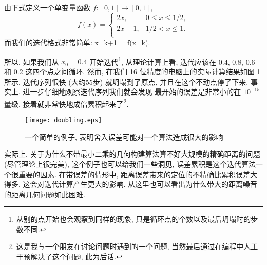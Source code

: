 \documentclass{CASthesis_zzk}
\begin{document}
由下式定义一个单变量函数 $f: [0,1]\rightarrow [0,1]$,
\begin{equation}
  f(x)=
  \left\{
    \begin{array}{ll}
      2x,  & 0\leq x \leq 1/2, \\
      2x-1, & 1/2<x\leq 1. \\
    \end{array}
  \right.
\end{equation}
而我们的迭代格式非常简单:
\be x_{k+1} = f(x_k). \ee

所以, 如果我们从 $x_0 = 0.4$ 开始迭代\footnote{从别的点开始也会观察到同样的现象, 只是循环点的个数以及最后坍塌时的步数不同.}, 
从理论计算上看, 迭代应该在 0.4, 0.8, 0.6 和 0.2 这四个点之间循环. 
然而, 在我们 16 位精度的电脑上的实际计算结果如图 \ref{fig:doubling} 所示, 
迭代序列很快 (大约55步) 就坍塌到了原点, 并且在这个不动点停了下来.
事实上, 进一步仔细地观察迭代序列我们就会发现
最开始的误差是非常小的\pozhe 在 $10^{-15}$ 量级, 
接着就非常快地成倍累积起来了\footnote{这是我与一个朋友在讨论问题时遇到的一个问题, 当然最后通过在编程中人工干预解决了这个问题, 此为后话.}.

\begin{figure}[htp]
  \centering
  \texttt{[image: doubling.eps]}\\
  \caption{一个简单的例子, 表明舍入误差可能对一个算法造成很大的影响}
  \label{fig:doubling}
\end{figure}

实际上, 关于为什么不带最小二乘的几何构建算法算不好大规模的精确距离的问题 
(尽管理论上很完美),
这个例子也可以给我们一些洞见, 误差累积是这个迭代算法一个很重要的因素.
在带误差的情形中, 距离误差带来的定位的不精确比累积误差大得多,
这会对迭代计算产生更大的影响. 
从这里也可以看出为什么带大的距离噪音的距离几何问题如此困难.



\backmatter
    
  
  
  
  \newpage 
  \cleardoublepage
  \printindex

  
  
  
\end{document}
